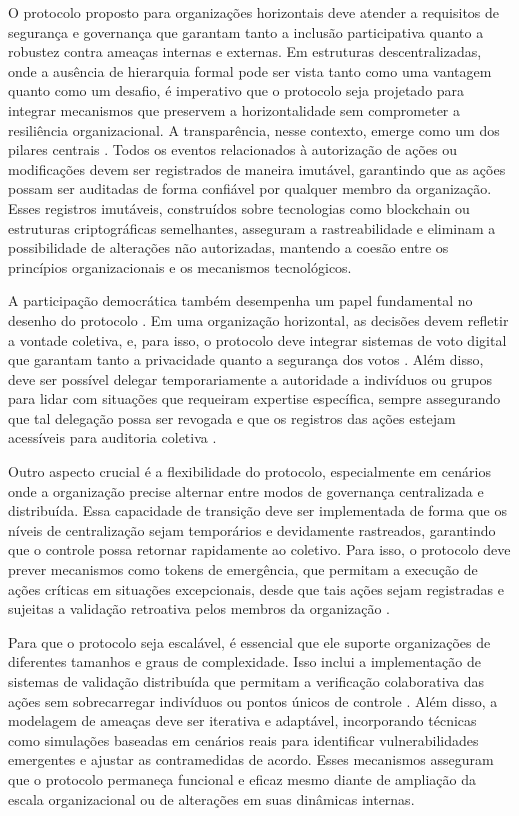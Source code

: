 O protocolo proposto para organizações horizontais deve atender a requisitos de
segurança e governança que garantam tanto a inclusão participativa quanto a
robustez contra ameaças internas e externas. Em estruturas descentralizadas,
onde a ausência de hierarquia formal pode ser vista tanto como uma vantagem
quanto como um desafio, é imperativo que o protocolo seja projetado para
integrar mecanismos que preservem a horizontalidade sem comprometer a
resiliência organizacional. A transparência, nesse contexto, emerge como um dos
pilares centrais \cite{Colbac}. Todos os eventos relacionados à autorização de ações ou
modificações devem ser registrados de maneira imutável, garantindo que as ações
possam ser auditadas de forma confiável por qualquer membro da organização.
Esses registros imutáveis, construídos sobre tecnologias como blockchain ou
estruturas criptográficas semelhantes, asseguram a rastreabilidade e eliminam a
possibilidade de alterações não autorizadas, mantendo a coesão entre os
princípios organizacionais e os mecanismos tecnológicos.

A participação democrática também desempenha um papel fundamental no desenho do
protocolo \cite{Colbac}. Em uma organização horizontal, as decisões devem refletir a vontade
coletiva, e, para isso, o protocolo deve integrar sistemas de voto digital que
garantam tanto a privacidade quanto a segurança dos votos \cite{Colbac}. Além disso, deve ser
possível delegar temporariamente a autoridade a indivíduos ou grupos para lidar
com situações que requeiram expertise específica, sempre assegurando que tal
delegação possa ser revogada e que os registros das ações estejam acessíveis
para auditoria coletiva \cite{Colbac}.

Outro aspecto crucial é a flexibilidade do protocolo, especialmente em cenários
onde a organização precise alternar entre modos de governança centralizada e
distribuída. Essa capacidade de transição deve ser implementada de forma que os
níveis de centralização sejam temporários e devidamente rastreados, garantindo
que o controle possa retornar rapidamente ao coletivo. Para isso, o protocolo
deve prever mecanismos como tokens de emergência, que permitam a execução de
ações críticas em situações excepcionais, desde que tais ações sejam registradas
e sujeitas a validação retroativa pelos membros da organização \cite{Colbac}.

Para que o protocolo seja escalável, é essencial que ele suporte organizações de
diferentes tamanhos e graus de complexidade. Isso inclui a implementação de
sistemas de validação distribuída que permitam a verificação colaborativa das
ações sem sobrecarregar indivíduos ou pontos únicos de controle \cite{Colbac}. Além disso, a
modelagem de ameaças deve ser iterativa e adaptável, incorporando técnicas como
simulações baseadas em cenários reais para identificar vulnerabilidades
emergentes e ajustar as contramedidas de acordo. Esses mecanismos
asseguram que o protocolo permaneça funcional e eficaz mesmo diante
de ampliação da escala organizacional ou de alterações em suas dinâmicas
internas.

